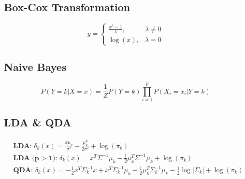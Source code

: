 \documentclass[a4paper,9pt,fleqn]{extarticle}
\begin{document}
\noindent
\begin{minipage}[t]{0.45\textwidth}
    \subsection*{Box-Cox Transformation}
    \[
        y =
        \begin{cases}
            \displaystyle \frac{x^{\lambda}-1}{\lambda}, & \lambda \neq 0 \\
            \log(x), & \lambda = 0
        \end{cases}
    \]
    \subsection*{Naive Bayes}
    \[
    P(Y = k | X = x) = \frac{1}{Z}P(Y = k) \prod_{i=1}^{p}P(X_i = x_i | Y = k)
    \]
\end{minipage}%
\hspace{0.05\textwidth} %
\begin{minipage}[t]{0.45\textwidth}
    \raggedright  %
    \subsection*{LDA \& QDA}
    \begin{equation*}
    \begin{aligned}
    &\textbf{LDA: } \delta_k(x) = \frac{x \mu_k}{\sigma^2} - \frac{\mu_k^2}{2\sigma^2} + \log(\pi_k) \\
    &\textbf{LDA (p > 1): } \delta_k(x) = x^T \Sigma^{-1} \mu_k - \frac{1}{2} \mu_k^T \Sigma^{-1} \mu_k + \log(\pi_k) \\
    &\textbf{QDA: } \delta_k(x) = -\frac{1}{2} x^T \Sigma_k^{-1} x + x^T \Sigma_k^{-1} \mu_k - \frac{1}{2} \mu_k^T \Sigma_k^{-1} \mu_k - \frac{1}{2} \log|\Sigma_k| + \log(\pi_k)
    \end{aligned}
    \end{equation*}
\end{minipage}
\end{document}
